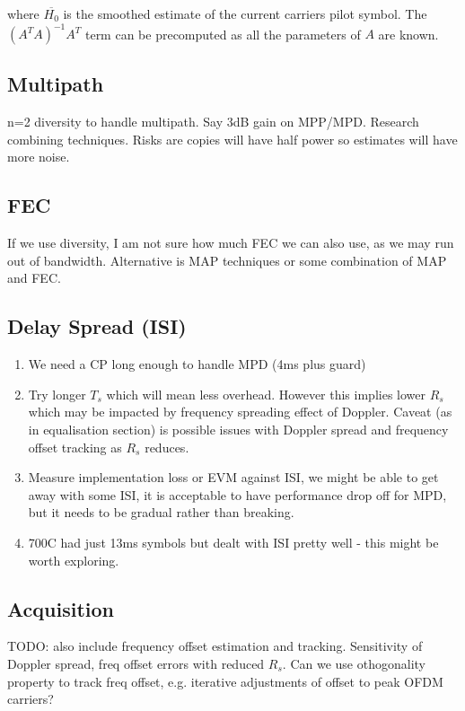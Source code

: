 \documentclass{article}
\begin{document}
where $\overline{H_0}$ is the smoothed estimate of the current carriers pilot symbol.  The $(A^TA)^{-1}A^T$ term can be precomputed as all the parameters of $A$ are known. 

\subsection{Multipath}

n=2 diversity to handle multipath.  Say 3dB gain on MPP/MPD.  Research combining techniques. Risks are copies will have half power so estimates will have more noise.

\subsection{FEC}

If we use diversity, I am not sure how much FEC we can also use, as we may run out of bandwidth.  Alternative is MAP techniques or some combination of MAP and FEC.

\subsection{Delay Spread (ISI)}

\begin{enumerate}
\item We need a CP long enough to handle MPD (4ms plus guard)
\item Try longer $T_s$ which will mean less overhead. However this implies lower $R_s$ which may be impacted by frequency spreading effect of Doppler.  Caveat (as in equalisation section) is possible issues with Doppler spread and frequency offset tracking as $R_s$ reduces.
\item Measure implementation loss or EVM against ISI, we might be able to get away with some ISI, it is acceptable to have performance drop off for MPD, but it needs to be gradual rather than breaking.
\item 700C had just 13ms symbols but dealt with ISI pretty well - this might be worth exploring.
\end{enumerate}

\subsection{Acquisition}

TODO: also include frequency offset estimation and tracking.  Sensitivity of Doppler spread, freq offset errors with reduced $R_s$. Can we use othogonality property to track freq offset, e.g. iterative adjustments of offset to peak OFDM carriers?
\end{document}
